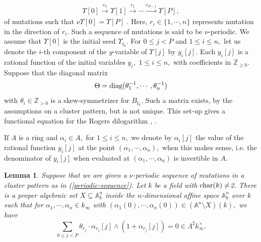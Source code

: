 \documentclass{amsart}
\newtheorem{lemma}[theorem]{Lemma}
\theoremstyle{definition}
\numberwithin{equation}{subsection}
\begin{document}
\begin{eqnarray}\label{periodic-sequence}
\Upsilon[0] \xrightarrow{r_0} \Upsilon[1] \xrightarrow{r_1} \cdots \xrightarrow{r_{P-1}} \Upsilon[P],   
\end{eqnarray}
of mutations such that $\nu \Upsilon[0]=\Upsilon[P]$ \cite[]{nak}. Here, $r_{i}\in \{1,\cdots,n \}$  represents mutation in the direction of $r_i.$   Such a sequence of mutations is said to be $\nu$-periodic. We  assume that $\Upsilon[0]$ is the initial seed $\Upsilon_{t_0}.$ For $0\leq j<P$ and $1\leq i \leq n,$ let us denote the $i$-th component of the $y$-variable of $\Upsilon[j]$ by $y_i[j].$ Each $y_{i}[j]$ is a rational function of the initial variables $y_{i},$ $1\leq i\leq n,$ with coefficients in $\mathbb{Z}_{\geq 0}.$    Suppose that the diagonal matrix 
$$
\Theta = {\rm diag} (\theta_{1} ^{-1}, \cdots, \theta_{n} ^{-1} ) 
$$
with $\theta_{i} \in \mathbb{Z}_{>0}$ is a skew-symmetrizer for 
$B_{t_0}.$ Such a matrix exists, by the assumptions on a cluster pattern, but is not unique. This set-up gives a functional equation for the Rogers dilogarithm \cite[Theorem 3.5]{nak}, \cite[Theorem 6.1, Theorem 6.8]{nak-per}.

If $A$ is a ring and $\alpha_i \in A,$ for $1\leq i\leq n,$ we  denote by $\alpha _{i}[j]$ the value of the rational function $y_{i}[j]$ at the point $(\alpha_1,\cdots, \alpha_n),$ when this makes sense, i.e. the denominator of   $y_{i}[j]$ when evaluated at $(\alpha_1, \cdots, \alpha_n)$ is invertible in $A.$ 

\begin{lemma}\label{lemma}
Suppose that we are given a $\nu$-periodic sequence of mutations in a cluster pattern as in (\ref{periodic-sequence}). Let $k$ be a field with   ${\rm char}(k)\neq$2. There is a proper algebraic set $X \subseteq \mathbb{A}^{n}_{k}$ inside the $n$-dimensional affine space $\mathbb{A}^{n}_{k}$ over $k$ such that for ${\alpha}_{1}, \cdots, {\alpha} _{n} \in k_{\infty} $ with $({\alpha}_{1}(0), \cdots, {\alpha} _{n} (0)) \in (\mathbb{A}^n \setminus X)(k),$ we have 
$$
\sum_{0\leq j <P}\theta _{r_{j}}\cdot {\alpha} _{r_j}[j] \wedge (1 +{\alpha} _{r_j}[j])=0 \in \Lambda ^{2} k_{\infty} ^{\times}.   
 $$
 
\end{lemma}
\end{document}
